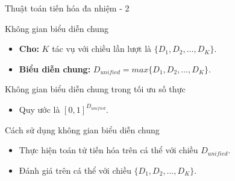 \begin{frame}{Thuật toán tiến hóa đa nhiệm - 2}
    \begin{alertblock}{Không gian biểu diễn chung}
        \begin{itemize}
            \item \textbf{Cho:} $K$ tác vụ với chiều lần lượt là $\{D_1, D_2, \ldots, D_{K}\}$.
            \item \textbf{Biểu diễn chung:} $D_{unified}=max\{D_1, D_2, \ldots, D_{K}\}$.
        \end{itemize}
    \end{alertblock}
    \begin{alertblock}{Không gian biểu diễn chung trong tối ưu số thực}
        \begin{itemize}
            \item Quy ước là $[0, 1]^{D_{unified}}$.
        \end{itemize}
    \end{alertblock}
    \begin{block}{Cách sử dụng không gian biểu diễn chung}
        \begin{itemize}
            \item Thực hiện toán tử tiến hóa trên cá thể với chiều $D_{unified}$.
            \item Đánh giá trên cá thể với chiều $\{D_1, D_2, \ldots, D_{K}\}$.
        \end{itemize}
    \end{block}
\end{frame}

